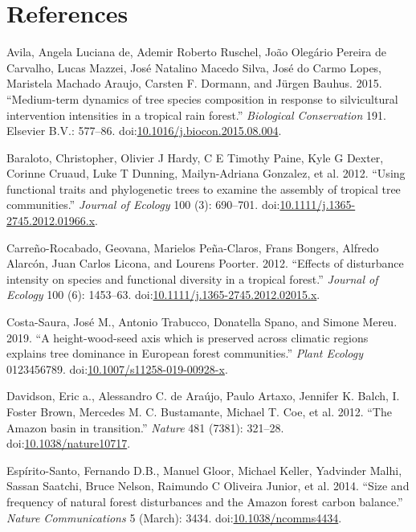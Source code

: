 \documentclass[]{elsarticle} %
\begin{document}
\section*{References}\label{references}

\hypertarget{refs}{}
\hypertarget{ref-DeAvila2015}{}
Avila, Angela Luciana de, Ademir Roberto Ruschel, João Olegário Pereira
de Carvalho, Lucas Mazzei, José Natalino Macedo Silva, José do Carmo
Lopes, Maristela Machado Araujo, Carsten F. Dormann, and Jürgen Bauhus.
2015. ``Medium-term dynamics of tree species composition in response to
silvicultural intervention intensities in a tropical rain forest.''
\emph{Biological Conservation} 191. Elsevier B.V.: 577--86.
doi:\href{https://doi.org/10.1016/j.biocon.2015.08.004}{10.1016/j.biocon.2015.08.004}.

\hypertarget{ref-Baraloto2012a}{}
Baraloto, Christopher, Olivier J Hardy, C E Timothy Paine, Kyle G
Dexter, Corinne Cruaud, Luke T Dunning, Mailyn-Adriana Gonzalez, et al.
2012. ``Using functional traits and phylogenetic trees to examine the
assembly of tropical tree communities.'' \emph{Journal of Ecology} 100
(3): 690--701.
doi:\href{https://doi.org/10.1111/j.1365-2745.2012.01966.x}{10.1111/j.1365-2745.2012.01966.x}.

\hypertarget{ref-Carreno-Rocabado2012}{}
Carreño-Rocabado, Geovana, Marielos Peña-Claros, Frans Bongers, Alfredo
Alarcón, Juan Carlos Licona, and Lourens Poorter. 2012. ``Effects of
disturbance intensity on species and functional diversity in a tropical
forest.'' \emph{Journal of Ecology} 100 (6): 1453--63.
doi:\href{https://doi.org/10.1111/j.1365-2745.2012.02015.x}{10.1111/j.1365-2745.2012.02015.x}.

\hypertarget{ref-Costa-Saura2019}{}
Costa-Saura, José M., Antonio Trabucco, Donatella Spano, and Simone
Mereu. 2019. ``A height-wood-seed axis which is preserved across
climatic regions explains tree dominance in European forest
communities.'' \emph{Plant Ecology} 0123456789.
doi:\href{https://doi.org/10.1007/s11258-019-00928-x}{10.1007/s11258-019-00928-x}.

\hypertarget{ref-Davidson2012}{}
Davidson, Eric a., Alessandro C. de Araújo, Paulo Artaxo, Jennifer K.
Balch, I. Foster Brown, Mercedes M. C. Bustamante, Michael T. Coe, et
al. 2012. ``The Amazon basin in transition.'' \emph{Nature} 481 (7381):
321--28.
doi:\href{https://doi.org/10.1038/nature10717}{10.1038/nature10717}.

\hypertarget{ref-Espirito-Santo2014}{}
Espírito-Santo, Fernando D.B., Manuel Gloor, Michael Keller, Yadvinder
Malhi, Sassan Saatchi, Bruce Nelson, Raimundo C Oliveira Junior, et al.
2014. ``Size and frequency of natural forest disturbances and the Amazon
forest carbon balance.'' \emph{Nature Communications} 5 (March): 3434.
doi:\href{https://doi.org/10.1038/ncomms4434}{10.1038/ncomms4434}.
\end{document}
